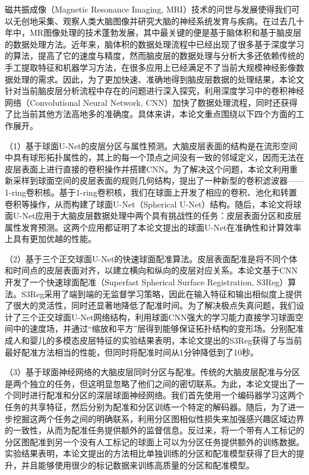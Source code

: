 \cleardoublepage
{}
磁共振成像（Magnetic Resonance Imaging, MRI）技术的问世与发展使得我们可以无创地采集、观察人类大脑图像并研究大脑的神经系统发育与疾病。在过去几十年中，MR图像处理的技术蓬勃发展，其中最关键的便是基于脑体积和基于脑皮层的数据处理方法。近年来，脑体积的数据处理流程中已经出现了很多基于深度学习的算法，提高了它的速度与精度，然而脑皮层的数据处理与分析大多还依赖传统的手工提取特征和机器学习方法，在很多应用上已经满足不了当前大规模神经影像数据处理的需求。因此，为了更加快速、准确地得到脑皮层数据的处理结果，本论文针对当前脑皮层分析流程中存在的问题进行深入探究，利用深度学习中的卷积神经网络（Convolutional Neural Network, CNN）加快了数据处理流程，同时还获得了比当前其他方法高地多的准确度。具体来讲，本论文重点围绕以下四个方面的工作展开。

（1）基于球面U-Net的皮层分区与属性预测。大脑皮层表面的结构是在流形空间中具有球形拓扑属性的，其上的每一个顶点之间没有一致的邻域定义，因而无法在皮层表面上进行直接的卷积操作并搭建CNN。为了解决这个问题，本论文利用重新采样到球面空间的皮层表面的规则几何结构，提出了一种新型的卷积滤波器——1-ring卷积核。基于1-ring卷积核，我们在球面上开发了相应的卷积、池化和转置卷积等操作，从而构建了球面U-Net（Spherical U-Net）结构。随后，本论文将球面U-Net应用于大脑皮层数据处理中两个具有挑战性的任务：皮层表面分区和皮层属性发育预测。这两个应用都证明了本论文提出的球面U-Net在准确性和计算效率上具有更加优越的性能。

（2）基于三个正交球面U-Net的快速球面配准算法。皮层表面配准是将不同个体和时间点的皮层表面对齐，以建立横向和纵向的皮层对应关系。本论文基于CNN开发了一个快速球面配准（Superfast Spherical Surface Registration, S3Reg）算法。S3Reg采用了端到端的无监督学习策略，因此在输入特征和输出相似度上提供了很大的灵活性，同时还显著地降低了配准时间。为了解决极点失真问题，我们设计了三个正交球面U-Net网络结构，利用球面CNN强大的学习能力直接学习球面空间中的速度场，并通过“缩放和平方”层得到能够保证拓扑结构的变形场。分别配准成人和婴儿的多模态皮层特征的实验结果表明，本论文提出的S3Reg获得了与当前最好配准方法相当的性能，但同时将配准时间从1分钟降低到了10秒。

（3）基于球面神经网络的大脑皮层同时分区与配准。传统的大脑皮层配准与分区是两个独立的任务，但这明显忽略了他们之间的密切联系。为此，本论文提出了一个同时进行配准和分区的深层球面神经网络。我们首先使用一个编码器学习这两个任务的共享特征，然后分别为配准和分区训练一个特定的解码器。随后，为了进一步挖掘这两个任务之间的明确联系，利用分区图相似性损失来加强感兴趣区域边界的一致性，从而为配准任务提供额外的监督信息。反过来，将一个带有人工标记的分区图配准到另一个没有人工标记的球面上可以为分区任务提供额外的训练数据。实验结果表明，本论文提出的方法相比单独训练的分区和配准模型获得了巨大的提升，并且能够使用很少的标记数据来训练高质量的分区和配准模型。

